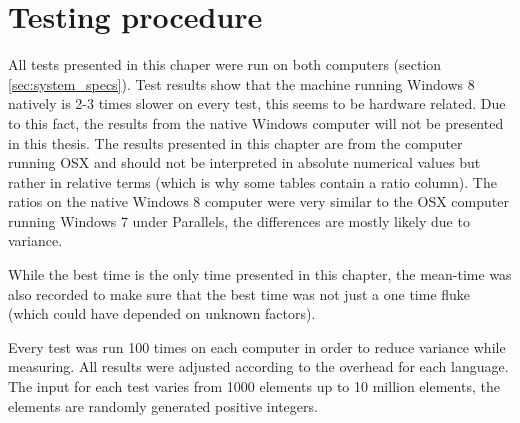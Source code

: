 \section{Testing procedure}
All tests presented in this chaper were run on both computers (section \ref{sec:system_specs}). Test results show that the machine running Windows 8 natively is 2-3 times slower on every test, this seems to be hardware related. Due to this fact, the results from the native Windows computer will not be presented in this thesis. The results presented in this chapter are from the computer running OSX and should not be interpreted in absolute numerical values but rather in relative terms (which is why some tables contain a ratio column). The ratios on the native Windows 8 computer were very similar to the OSX computer running Windows 7 under Parallels, the differences are mostly likely due to variance.

While the best time is the only time presented in this chapter, the mean-time was also recorded to make sure that the best time was not just a one time fluke (which could have depended on unknown factors). 

Every test was run 100 times on each computer in order to reduce variance while measuring. All results were adjusted according to the overhead for each language. The input for each test varies from 1000 elements up to 10 million elements, the elements are randomly generated positive integers. 